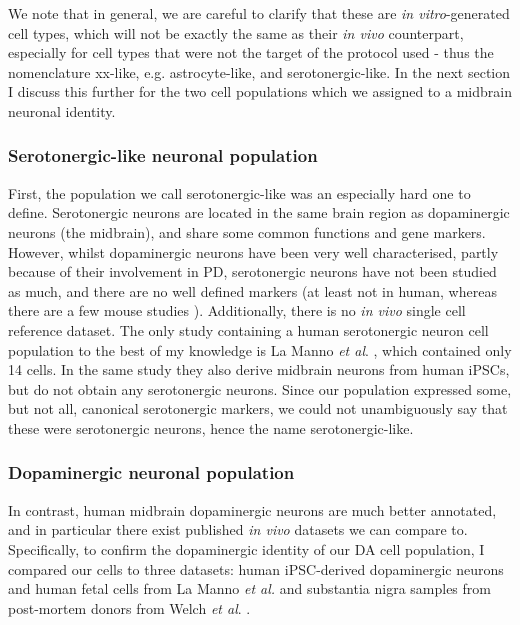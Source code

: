 We note that in general, we are careful to clarify that these are \textit{in vitro}-generated cell types, which will not be exactly the same as their \textit{in vivo} counterpart, especially for cell types that were not the target of the protocol used - thus the nomenclature xx-like, e.g. astrocyte-like, and serotonergic-like.
In the next section I discuss this further for the two cell populations which we assigned to a midbrain neuronal identity.

\subsubsection{Serotonergic-like neuronal population}

First, the population we call serotonergic-like was an especially hard one to define.
Serotonergic neurons are located in the same brain region as dopaminergic neurons 
(the midbrain),
and share some common functions and gene markers.
However, whilst dopaminergic neurons have been very well characterised, partly because of their involvement in PD, serotonergic neurons have not been studied as much, and there are no well defined markers (at least not in human, whereas there are a few mouse studies \cite{cummings2019serotonergic}).
Additionally, there is no \textit{in vivo} single cell reference dataset.
The only study containing a human serotonergic neuron cell population to the best of my knowledge is La Manno \textit{et al}. \cite{la2016molecular}, which contained only 14 cells.
In the same study they also derive midbrain neurons from human iPSCs, but do not obtain any serotonergic neurons.
Since our population expressed some, but not all, canonical serotonergic markers, 
we could not unambiguously say that these were serotonergic neurons, hence the name serotonergic-like.

\subsubsection{Dopaminergic neuronal population}

In contrast, human midbrain dopaminergic neurons are much better annotated, and in particular there exist published \textit{in vivo} datasets we can compare to.
Specifically, to confirm the dopaminergic identity of our DA cell population, I compared our cells to three datasets: human iPSC-derived dopaminergic neurons and human fetal cells from La Manno \textit{et al.} \cite{la2016molecular} and substantia nigra samples from post-mortem donors from Welch \textit{et al}. \cite{welch2019single}. \\

